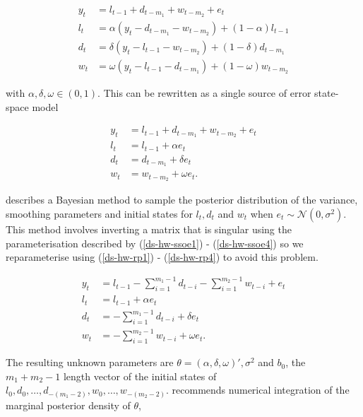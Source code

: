 \documentclass{article}\usepackage[]{graphicx}\usepackage[]{color}
\numberwithin{equation}{section}
\begin{document}
\begin{align}
y_t &= l_{t-1} + d_{t-m_1} + w_{t-m_2} + e_t \label{ds-hw1} \\
l_t &= \alpha (y_t - d_{t-m_1} - w_{t-m_2}) + (1 - \alpha)l_{t-1} \label{ds-hw2}\\
d_t &= \delta (y_t - l_{t-1} - w_{t-m_2}) + (1 - \delta)d_{t-m_1} \label{ds-hw3} \\
w_t &= \omega (y_t - l_{t-1} - d_{t-m_1}) + (1 - \omega)w_{t-m_2} \label{ds-hw4}
\end{align}

with $\alpha, \delta, \omega \in (0, 1)$. This can be rewritten as a single source of error state-space model \citep{Snyder1985}

\begin{align}
y_t &= l_{t-1} + d_{t-m_1} + w_{t-m_2} + e_t \label{ds-hw-ssoe1} \\
l_t &= l_{t-1} + \alpha e_t \label{ds-hw-ssoe2} \\
d_t &= d_{t-m_1} + \delta e_t \label{ds-hw-ssoe3} \\
w_t &= w_{t-m_2} + \omega e_t \label{ds-hw-ssoe4}. 
\end{align}

\citet{Forbes2000} describes a Bayesian method to sample the posterior distribution of the variance, smoothing parameters and initial states for $l_t, d_t$ and $w_t$ when $e_t \sim \mathcal{N}(0, \sigma^2)$. This method involves inverting a matrix that is singular using the parameterisation described by (\ref{ds-hw-ssoe1}) - (\ref{ds-hw-ssoe4}) so we reparameterise using (\ref{ds-hw-rp1}) - (\ref{ds-hw-rp4}) to avoid this problem.

\begin{align}
y_t &= l_{t-1} - \sum_{i = 1}^{m_1 - 1}d_{t-i} - \sum_{i = 1}^{m_2 - 1}w_{t-i} + e_t \label{ds-hw-rp1} \\
l_t &= l_{t-1} + \alpha e_t \label{ds-hw-rp2} \\
d_t &= - \sum_{i = 1}^{m_1 - 1}d_{t-i} + \delta e_t \label{ds-hw-rp3} \\
w_t &= - \sum_{i = 1}^{m_2 - 1}w_{t-i} + \omega e_t \label{ds-hw-rp4}.
\end{align}

The resulting unknown parameters are $\theta = (\alpha, \delta, \omega)', \sigma^2$ and $b_0$, the $m_1 + m_2 - 1$ length vector of the initial states of $l_0, d_0, \dots, d_{-(m_1 - 2)}, w_0, \dots, w_{-(m_2 - 2)}$.
\citet{Forbes2000} recommends numerical integration of the marginal posterior density of $\theta$,
\end{document}
